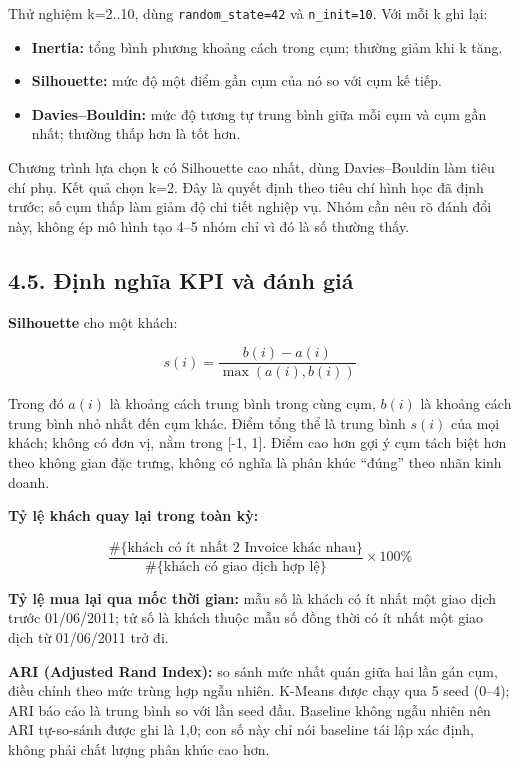 \documentclass[a4paper]{article}
\begin{document}
Thử nghiệm k=2..10, dùng \texttt{random\_state=42} và \texttt{n\_init=10}. Với mỗi k ghi lại:

\begin{itemize}
\item \textbf{Inertia:} tổng bình phương khoảng cách trong cụm; thường giảm khi k tăng.
\item \textbf{Silhouette:} mức độ một điểm gần cụm của nó so với cụm kế tiếp.
\item \textbf{Davies--Bouldin:} mức độ tương tự trung bình giữa mỗi cụm và cụm gần nhất; thường thấp hơn là tốt hơn.
\end{itemize}

Chương trình lựa chọn k có Silhouette cao nhất, dùng Davies--Bouldin làm tiêu chí phụ. Kết quả chọn k=2. Đây là quyết định theo tiêu chí hình học đã định trước; số cụm thấp làm giảm độ chi tiết nghiệp vụ. Nhóm cần nêu rõ đánh đổi này, không ép mô hình tạo 4--5 nhóm chỉ vì đó là số thường thấy.

\subsection*{4.5. Định nghĩa KPI và đánh giá}

\textbf{Silhouette} cho một khách:

\[
s(i)=\frac{b(i)-a(i)}{\max(a(i),b(i))}
\]

Trong đó \(a(i)\) là khoảng cách trung bình trong cùng cụm, \(b(i)\) là khoảng cách trung bình nhỏ nhất đến cụm khác. Điểm tổng thể là trung bình \(s(i)\) của mọi khách; không có đơn vị, nằm trong [-1, 1]. Điểm cao hơn gợi ý cụm tách biệt hơn theo không gian đặc trưng, không có nghĩa là phân khúc “đúng” theo nhãn kinh doanh.

\textbf{Tỷ lệ khách quay lại trong toàn kỳ:}

\[
\frac{\#\{\text{khách có ít nhất 2 Invoice khác nhau}\}}
{\#\{\text{khách có giao dịch hợp lệ}\}}\times 100\%
\]

\textbf{Tỷ lệ mua lại qua mốc thời gian:} mẫu số là khách có ít nhất một giao dịch trước 01/06/2011; tử số là khách thuộc mẫu số đồng thời có ít nhất một giao dịch từ 01/06/2011 trở đi.

\textbf{ARI (Adjusted Rand Index):} so sánh mức nhất quán giữa hai lần gán cụm, điều chỉnh theo mức trùng hợp ngẫu nhiên. K-Means được chạy qua 5 seed (0--4); ARI báo cáo là trung bình so với lần seed đầu. Baseline không ngẫu nhiên nên ARI tự-so-sánh được ghi là 1,0; con số này chỉ nói baseline tái lập xác định, không phải chất lượng phân khúc cao hơn.
\end{document}
